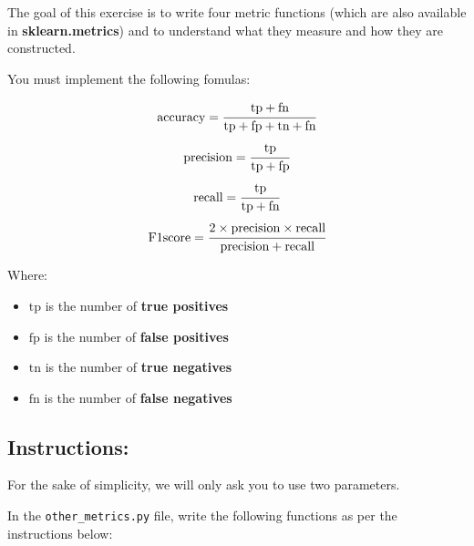 \documentclass[]{article}
\begin{document}
The goal of this exercise is to write four metric functions (which are
also available in \textbf{sklearn.metrics}) and to understand what they
measure and how they are constructed.

You must implement the following fomulas:

\large

\[
\text{accuracy} = \cfrac{\text{tp} + \text{fn}}{\text{tp} + \text{fp} + \text{tn} + \text{fn}}
\] \normalsize \large \[
\text{precision} = \cfrac{\text{\text{tp}}}{\text{tp} + \text{fp}}
\] \normalsize \large \[
\text{recall} = \cfrac{\text{tp}}{\text{tp} + \text{fn}}
\] \normalsize \large \[
\text{F1score} = \cfrac{2 \times \text{precision} \times \text{recall}}{\text{precision} + \text{recall}}
\] \normalsize

Where:

\begin{itemize}
\item
  \(\text{tp}\) is the number of \textbf{true positives}
\item
  \(\text{fp}\) is the number of \textbf{false positives}
\item
  \(\text{tn}\) is the number of \textbf{true negatives}
\item
  \(\text{fn}\) is the number of \textbf{false negatives}
\end{itemize}

\hypertarget{instructions-10}{%
\subsection{Instructions:}\label{instructions-10}}

For the sake of simplicity, we will only ask you to use two parameters.

In the \texttt{other\_metrics.py} file, write the following functions as
per the instructions below:
\end{document}
